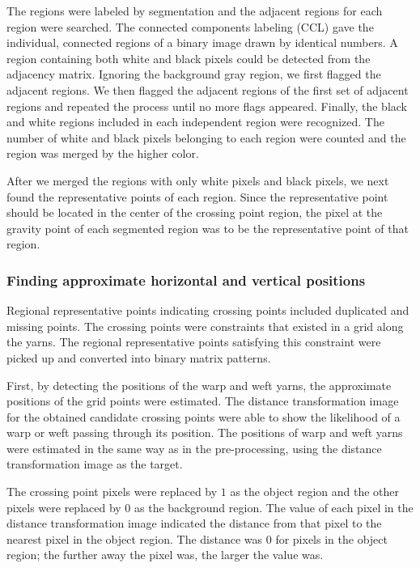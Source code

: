 The regions were labeled by segmentation and the adjacent regions for each region were searched. The connected components labeling (CCL) gave the individual, connected regions of a binary image drawn by identical numbers. A region containing both white and black pixels could be detected from the adjacency matrix. Ignoring the background gray region, we first flagged the adjacent regions. We then flagged the adjacent regions of the first set of adjacent regions and repeated the process until no more flags appeared. Finally, the black and white regions included in each independent region were recognized. The number of white and black pixels belonging to each region were counted and the region was merged by the higher color.

After we merged the regions with only white pixels and black pixels, we next found the representative points of each region. Since the representative point should be located in the center of the crossing point region, the pixel at the gravity point of each segmented region was to be the representative point of that region. 

\vspace{0.2cm}

\subsubsection{Finding approximate horizontal and vertical positions} 
Regional representative points indicating crossing points included duplicated and missing points. The crossing points were constraints that existed in a grid along the yarns. The regional representative points satisfying this constraint were picked up and converted into binary matrix patterns.

First, by detecting the positions of the warp and weft yarns, the approximate positions of the grid points were estimated. The distance transformation image for the obtained candidate crossing points were able to show the likelihood of a warp or weft passing through its position. The positions of warp and weft yarns were estimated in the same way as in the pre-processing, using the distance transformation image as the target.

The crossing point pixels were replaced by $1$ as the object region and the other pixels were replaced by $0$ as the background region. The value of each pixel in the distance transformation image indicated the distance from that pixel to the nearest pixel in the object region. The distance was $0$ for pixels in the object region; the further away the pixel was, the larger the value was.

